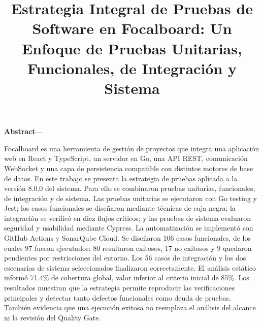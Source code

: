 \documentclass[conference]{IEEEtran}
\renewenvironment{abstract}
{
  \par\small
  \noindent\textbf{Abstract}---\normalfont
}
{\par}
\begin{document}
\title{Estrategia Integral de Pruebas de Software en Focalboard: Un Enfoque de Pruebas Unitarias, Funcionales, de Integración y Sistema\\}

\author{

}

\maketitle

\begin{abstract}
Focalboard es una herramienta de gestión de proyectos que integra una aplicación web en React y TypeScript, un servidor en Go, una API REST, comunicación WebSocket y una capa de persistencia compatible con distintos motores de base de datos. En este trabajo se presenta la estrategia de pruebas aplicada a la versión 8.0.0 del sistema. Para ello se combinaron pruebas unitarias, funcionales, de integración y de sistema. Las pruebas unitarias se ejecutaron con Go testing y Jest; los casos funcionales se diseñaron mediante técnicas de caja negra; la integración se verificó en diez flujos críticos; y las pruebas de sistema evaluaron seguridad y usabilidad mediante Cypress. La automatización se implementó con GitHub Actions y SonarQube Cloud. Se diseñaron 106 casos funcionales, de los cuales 97 fueron ejecutados: 80 resultaron exitosos, 17 no exitosos y 9 quedaron pendientes por restricciones del entorno. Los 56 casos de integración y los dos escenarios de sistema seleccionados finalizaron correctamente. El análisis estático informó 71.4\% de cobertura global, valor inferior al criterio inicial de 85\%. Los resultados muestran que la estrategia permite reproducir las verificaciones principales y detectar tanto defectos funcionales como deuda de pruebas. También evidencia que una ejecución exitosa no reemplaza el análisis del alcance ni la revisión del Quality Gate.
\end{abstract}
\vspace{\baselineskip}
\end{document}
